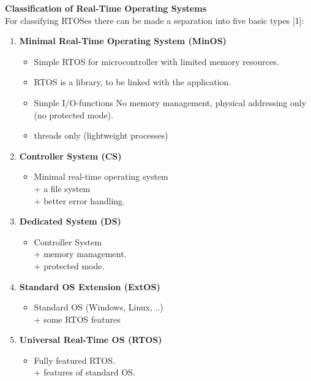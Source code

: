 {\rot\bf Classification of Real-Time Operating Systems}\\

For classifying RTOSes there can be made a separation into five basic types [1]:

\begin{enumerate}
\item  \textbf{Minimal Real-Time Operating System (MinOS)} 

\begin{itemize}
	\item Simple RTOS for microcontroller with limited memory resources.
	\item RTOS is a library, to be linked with the application.
	\item Simple I/O-functions No memory management, physical addressing only (no protected mode).
	\item threads only (lightweight processes)
\end{itemize}

\item  \textbf{Controller System (CS)} 

\begin{itemize}
	\item Minimal real-time operating system      \\ + a file system      \\ + better error handling.
\end{itemize}

\item  \textbf{Dedicated System (DS)}   
\begin{itemize}
	\item  Controller System      \\ + memory management.    \\ + protected mode.
\end{itemize}

\item  \textbf{Standard OS Extension (ExtOS)}
\begin{itemize}
	\item  Standard OS (Windows, Linux, ..)  \\ + some RTOS features
\end{itemize} 

\item  \textbf{Universal Real-Time OS (RTOS)} 
\begin{itemize}
	\item  Fully featured RTOS.  \\ + features of standard OS.
\end{itemize} 
\end{enumerate}

